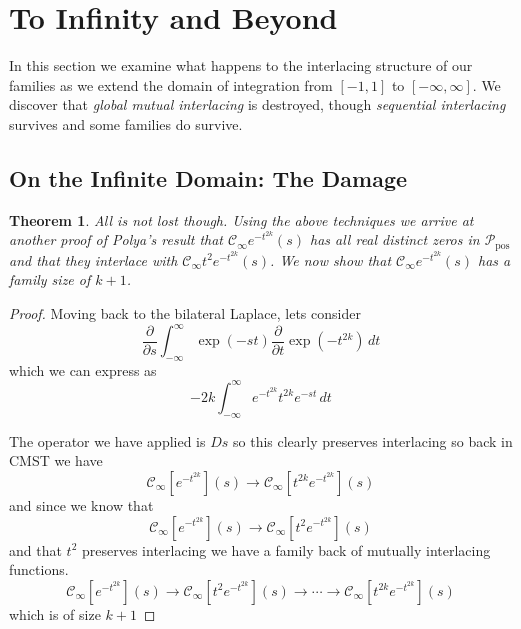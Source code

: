 \documentclass[11pt]{article}
\theoremstyle{breakdef}
\newtheorem{theorem}{Theorem}[section]
\begin{document}
\section{To Infinity and Beyond}

In this section we examine what happens to the interlacing structure of our families as we extend the domain of integration from $[-1,1]$ to $[-\infty,\infty]$. We discover that \emph{global mutual interlacing} is destroyed, though \emph{sequential interlacing} survives and some families do survive.

\subsection{On the Infinite Domain: The Damage}
\begin{theorem}
All is not lost though. Using the above techniques we arrive at another proof of Polya's result that $\mathcal{C}_{\infty}e^{-t^{2k}}(s)$ has all real distinct zeros in $\mathcal{P}_{\mathrm{pos}}$ and that they interlace with $\mathcal{C}_{\infty} t^2 e^{-t^{2k}}(s)$.  We now show that 
$\mathcal{C}_{\infty} e^{-t^{2k}}(s)$ has a family size of $k+1$.
\end{theorem}


\begin{proof}
Moving back to the bilateral Laplace, lets consider
\begin{equation}
\frac{\partial}{\partial s}  \int_{-\infty }^{\infty } \exp (-s t) \frac{\partial }{\partial t}\exp \left(-t^{2 k}\right) \, dt
\end{equation}
which we can express as
\begin{equation}
-2 k \int_{-\infty }^{\infty }  e^{-t^{2 k}} t^{2 k} e^{-s t} \, dt
\end{equation}

The operator we have applied is $Ds$ so this clearly preserves interlacing so back in CMST we have
\begin{equation}
\mathcal{C}_{\infty}[e^{-t^{2 k}}](s) \to \mathcal{C}_{\infty}[t^{2 k} e^{-t^{2 k}}](s)
\end{equation}
and since we know that
\begin{equation}
\mathcal{C}_{\infty}[e^{-t^{2 k}}](s) \to \mathcal{C}_{\infty}[t^{2} e^{-t^{2 k}}](s)
\end{equation}
and that $t^2$ preserves interlacing we have a family back of mutually interlacing functions.
\begin{equation}
\mathcal{C}_{\infty}[e^{-t^{2 k}}](s) \to \mathcal{C}_{\infty}[t^{2} e^{-t^{2 k}}](s) \to \cdots \to \mathcal{C}_{\infty}[ t^{2 k} e^{-t^{2 k}}](s)
\end{equation}
which is of size $k+1$
\end{proof}
\end{document}
